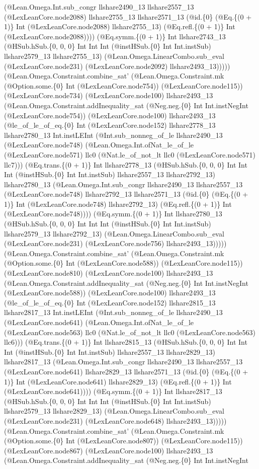 \documentclass[11pt]{article}
\begin{document}
(@Lean.Omega.Int.sub\_congr llshare2490\_13 llshare2557\_13 (@LexLeanCore.node2088) llshare2755\_13 llshare2571\_13 (@id.\{0\} (@Eq.\{(0 + 1)\} Int (@LexLeanCore.node2088) llshare2755\_13) (@Eq.refl.\{(0 + 1)\} Int (@LexLeanCore.node2088)))) (@Eq.symm.\{(0 + 1)\} Int llshare2743\_13 (@HSub.hSub.\{0, 0, 0\} Int Int Int (@instHSub.\{0\} Int Int.instSub) llshare2579\_13 llshare2755\_13) (@Lean.Omega.LinearCombo.sub\_eval (@LexLeanCore.node231) (@LexLeanCore.node2092) llshare2493\_13))))) (@Lean.Omega.Constraint.combine\_sat' (@Lean.Omega.Constraint.mk (@Option.some.\{0\} Int (@LexLeanCore.node754)) (@LexLeanCore.node115)) (@LexLeanCore.node734) (@LexLeanCore.node100) llshare2493\_13 (@Lean.Omega.Constraint.addInequality\_sat (@Neg.neg.\{0\} Int Int.instNegInt (@LexLeanCore.node754)) (@LexLeanCore.node100) llshare2493\_13 (@le\_of\_le\_of\_eq.\{0\} Int (@LexLeanCore.node152) llshare2778\_13 llshare2780\_13 Int.instLEInt (@Int.sub\_nonneg\_of\_le llshare2490\_13 (@LexLeanCore.node748) (@Lean.Omega.Int.ofNat\_le\_of\_le (@LexLeanCore.node571) llc0 (@Nat.le\_of\_not\_lt llc0 (@LexLeanCore.node571) llc7))) (@Eq.trans.\{(0 + 1)\} Int llshare2778\_13 (@HSub.hSub.\{0, 0, 0\} Int Int Int (@instHSub.\{0\} Int Int.instSub) llshare2557\_13 llshare2792\_13) llshare2780\_13 (@Lean.Omega.Int.sub\_congr llshare2490\_13 llshare2557\_13 (@LexLeanCore.node748) llshare2792\_13 llshare2571\_13 (@id.\{0\} (@Eq.\{(0 + 1)\} Int (@LexLeanCore.node748) llshare2792\_13) (@Eq.refl.\{(0 + 1)\} Int (@LexLeanCore.node748)))) (@Eq.symm.\{(0 + 1)\} Int llshare2780\_13 (@HSub.hSub.\{0, 0, 0\} Int Int Int (@instHSub.\{0\} Int Int.instSub) llshare2579\_13 llshare2792\_13) (@Lean.Omega.LinearCombo.sub\_eval (@LexLeanCore.node231) (@LexLeanCore.node756) llshare2493\_13))))) (@Lean.Omega.Constraint.combine\_sat' (@Lean.Omega.Constraint.mk (@Option.some.\{0\} Int (@LexLeanCore.node588)) (@LexLeanCore.node115)) (@LexLeanCore.node810) (@LexLeanCore.node100) llshare2493\_13 (@Lean.Omega.Constraint.addInequality\_sat (@Neg.neg.\{0\} Int Int.instNegInt (@LexLeanCore.node588)) (@LexLeanCore.node100) llshare2493\_13 (@le\_of\_le\_of\_eq.\{0\} Int (@LexLeanCore.node152) llshare2815\_13 llshare2817\_13 Int.instLEInt (@Int.sub\_nonneg\_of\_le llshare2490\_13 (@LexLeanCore.node641) (@Lean.Omega.Int.ofNat\_le\_of\_le (@LexLeanCore.node563) llc0 (@Nat.le\_of\_not\_lt llc0 (@LexLeanCore.node563) llc6))) (@Eq.trans.\{(0 + 1)\} Int llshare2815\_13 (@HSub.hSub.\{0, 0, 0\} Int Int Int (@instHSub.\{0\} Int Int.instSub) llshare2557\_13 llshare2829\_13) llshare2817\_13 (@Lean.Omega.Int.sub\_congr llshare2490\_13 llshare2557\_13 (@LexLeanCore.node641) llshare2829\_13 llshare2571\_13 (@id.\{0\} (@Eq.\{(0 + 1)\} Int (@LexLeanCore.node641) llshare2829\_13) (@Eq.refl.\{(0 + 1)\} Int (@LexLeanCore.node641)))) (@Eq.symm.\{(0 + 1)\} Int llshare2817\_13 (@HSub.hSub.\{0, 0, 0\} Int Int Int (@instHSub.\{0\} Int Int.instSub) llshare2579\_13 llshare2829\_13) (@Lean.Omega.LinearCombo.sub\_eval (@LexLeanCore.node231) (@LexLeanCore.node648) llshare2493\_13))))) (@Lean.Omega.Constraint.combine\_sat' (@Lean.Omega.Constraint.mk (@Option.some.\{0\} Int (@LexLeanCore.node807)) (@LexLeanCore.node115)) (@LexLeanCore.node867) (@LexLeanCore.node100) llshare2493\_13 (@Lean.Omega.Constraint.addInequality\_sat (@Neg.neg.\{0\} Int Int.instNegInt 
\end{document}
